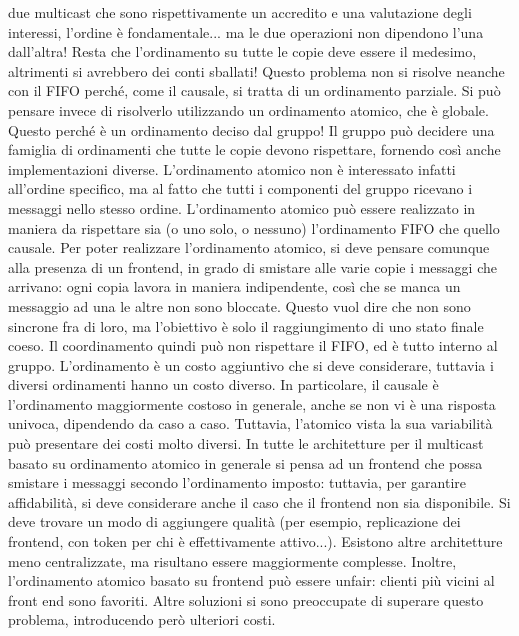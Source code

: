 due multicast che sono rispettivamente un accredito e una valutazione degli interessi, l'ordine è fondamentale... ma
le due operazioni non dipendono l'una dall'altra! Resta che l'ordinamento su tutte le copie deve essere il medesimo,
altrimenti si avrebbero dei conti sballati!
Questo problema non si risolve neanche con il FIFO perché, come il causale, si tratta di un ordinamento parziale. Si
può pensare invece di risolverlo utilizzando un ordinamento atomico, che è globale. Questo perché è un ordinamento
deciso dal gruppo! Il gruppo può decidere una famiglia di ordinamenti che tutte le copie devono rispettare, fornendo
così anche implementazioni diverse. L'ordinamento atomico non è interessato infatti all'ordine specifico, ma al fatto
che tutti i componenti del gruppo ricevano i messaggi nello stesso ordine. L'ordinamento atomico può essere realizzato
in maniera da rispettare sia (o uno solo, o nessuno) l'ordinamento FIFO che quello causale.
Per poter realizzare l'ordinamento atomico, si deve pensare comunque alla presenza di un frontend, in grado di smistare
alle varie copie i messaggi che arrivano: ogni copia lavora in maniera indipendente, così che se manca un messaggio
ad una le altre non sono bloccate. Questo vuol dire che non sono sincrone fra di loro, ma l'obiettivo è solo il
raggiungimento di uno stato finale coeso. Il coordinamento quindi può non rispettare il FIFO, ed è tutto interno al
gruppo.
L'ordinamento è un costo aggiuntivo che si deve considerare, tuttavia i diversi ordinamenti hanno un costo diverso. 
In particolare, il causale è l'ordinamento maggiormente costoso in generale, anche se non vi è una risposta univoca,
dipendendo da caso a caso. Tuttavia, l'atomico vista la sua variabilità può presentare dei costi molto diversi.
In tutte le architetture per il multicast basato su ordinamento atomico in generale si pensa ad un frontend che possa
smistare i messaggi secondo l'ordinamento imposto: tuttavia, per garantire affidabilità, si deve considerare anche il
caso che il frontend non sia disponibile. Si deve trovare un modo di aggiungere qualità (per esempio, replicazione dei
frontend, con token per chi è effettivamente attivo...). Esistono altre architetture meno centralizzate, ma risultano
essere maggiormente complesse.
Inoltre, l'ordinamento atomico basato su frontend può essere unfair: clienti più vicini al front end sono favoriti.
Altre soluzioni si sono preoccupate di superare questo problema, introducendo però ulteriori costi.
